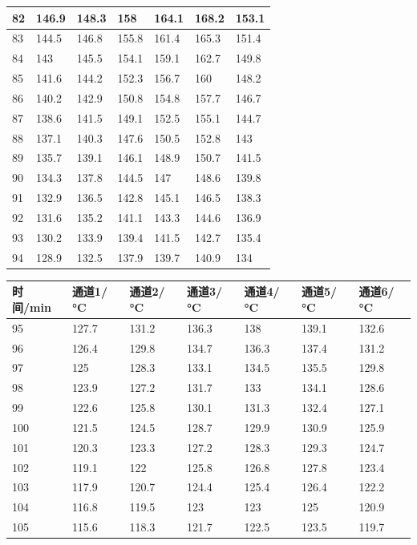 \documentclass[12pt,hyperref,a4paper,UTF8]{ctexart}
\begin{document}
\begin{table}[htp]
\begin{tabular}{|l|l|l|l|l|l|l|}
82     & 146.9  & 148.3  & 158    & 164.1  & 168.2  & 153.1  \\ \hline
83     & 144.5  & 146.8  & 155.8  & 161.4  & 165.3  & 151.4  \\ \hline
84     & 143    & 145.5  & 154.1  & 159.1  & 162.7  & 149.8  \\ \hline
85     & 141.6  & 144.2  & 152.3  & 156.7  & 160    & 148.2  \\ \hline
86     & 140.2  & 142.9  & 150.8  & 154.8  & 157.7  & 146.7  \\ \hline
87     & 138.6  & 141.5  & 149.1  & 152.5  & 155.1  & 144.7  \\ \hline
88     & 137.1  & 140.3  & 147.6  & 150.5  & 152.8  & 143    \\ \hline
89     & 135.7  & 139.1  & 146.1  & 148.9  & 150.7  & 141.5  \\ \hline
90     & 134.3  & 137.8  & 144.5  & 147    & 148.6  & 139.8  \\ \hline
91     & 132.9  & 136.5  & 142.8  & 145.1  & 146.5  & 138.3  \\ \hline
92     & 131.6  & 135.2  & 141.1  & 143.3  & 144.6  & 136.9  \\ \hline
93     & 130.2  & 133.9  & 139.4  & 141.5  & 142.7  & 135.4  \\ \hline
94     & 128.9  & 132.5  & 137.9  & 139.7  & 140.9  & 134    \\ \hline
\end{tabular}
\end{table}

\begin{table}
\centering
\begin{tabular}{|l|l|l|l|l|l|l|}
\hline
时间/min & 通道1/°C & 通道2/°C & 通道3/°C & 通道4/°C & 通道5/°C & 通道6/°C \\ \hline
95     & 127.7  & 131.2  & 136.3  & 138    & 139.1  & 132.6  \\ \hline
96     & 126.4  & 129.8  & 134.7  & 136.3  & 137.4  & 131.2  \\ \hline
97     & 125    & 128.3  & 133.1  & 134.5  & 135.5  & 129.8  \\ \hline
98     & 123.9  & 127.2  & 131.7  & 133    & 134.1  & 128.6  \\ \hline
99     & 122.6  & 125.8  & 130.1  & 131.3  & 132.4  & 127.1  \\ \hline
100    & 121.5  & 124.5  & 128.7  & 129.9  & 130.9  & 125.9  \\ \hline
101    & 120.3  & 123.3  & 127.2  & 128.3  & 129.3  & 124.7  \\ \hline
102    & 119.1  & 122    & 125.8  & 126.8  & 127.8  & 123.4  \\ \hline
103    & 117.9  & 120.7  & 124.4  & 125.4  & 126.4  & 122.2  \\ \hline
104    & 116.8  & 119.5  & 123    & 123    & 125    & 120.9  \\ \hline
105    & 115.6  & 118.3  & 121.7  & 122.5  & 123.5  & 119.7  \\ \hline
\end{tabular}
\end{table}


\clearpage



\end{document}
